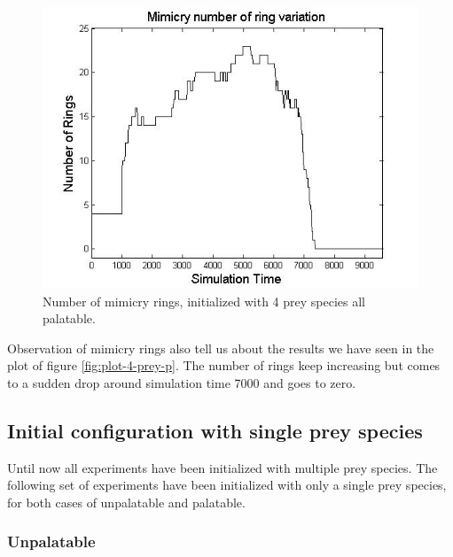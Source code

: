 \documentclass[letterpaper]{article}
\numberwithin{equation}{section}
\begin{document}
\begin{figure}[H]
	\centering
	\includegraphics[scale=0.50]{../tex/images/ringSize10k-4Prey-p}
	\caption[Number of mimicry rings (4 prey species all palatable)]{Number of mimicry rings, initialized with 4 prey species all palatable.}
	\label{fig:ringSize8k-4-Prey-p}
\end{figure}

Observation of mimicry rings also tell us about the results we have seen in the plot of figure \ref{fig:plot-4-prey-p}. The number of rings keep increasing but comes to a sudden drop around simulation time 7000 and goes to zero.

\subsection{Initial configuration with single prey species}
Until now all experiments have been initialized with multiple prey species. The following set of experiments have been initialized with only a single prey species, for both cases of unpalatable and palatable.

\subsubsection{Unpalatable}
\label{subsec:single-prey-unpalatable}
\end{document}
